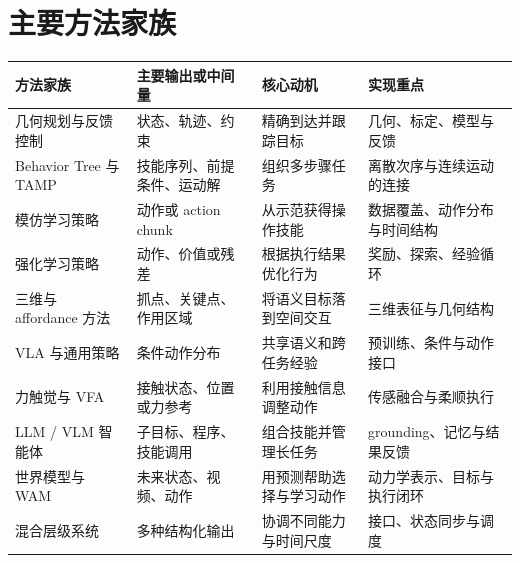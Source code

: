 \documentclass[UTF8,a4paper,11pt,oneside,openany,fontset=none]{ctexbook}
\begin{document}
\section{主要方法家族}

{\small %
\begin{longtable}[]{@{}
  >{\raggedright\arraybackslash}p{}
  >{\raggedright\arraybackslash}p{}
  >{\raggedright\arraybackslash}p{}
  >{\raggedright\arraybackslash}p{}@{}}
\toprule\noalign{}
\begin{minipage}[b]{\linewidth}\raggedright
方法家族
\end{minipage} & \begin{minipage}[b]{\linewidth}\raggedright
主要输出或中间量
\end{minipage} & \begin{minipage}[b]{\linewidth}\raggedright
核心动机
\end{minipage} & \begin{minipage}[b]{\linewidth}\raggedright
实现重点
\end{minipage} \\
\midrule\noalign{}
\endhead
\bottomrule\noalign{}
\endlastfoot
几何规划与反馈控制 & 状态、轨迹、约束 & 精确到达并跟踪目标 & 几何、标定、模型与反馈 \\
Behavior Tree 与 TAMP & 技能序列、前提条件、运动解 & 组织多步骤任务 & 离散次序与连续运动的连接 \\
模仿学习策略 & 动作或 action chunk & 从示范获得操作技能 & 数据覆盖、动作分布与时间结构 \\
强化学习策略 & 动作、价值或残差 & 根据执行结果优化行为 & 奖励、探索、经验循环 \\
三维与 affordance 方法 & 抓点、关键点、作用区域 & 将语义目标落到空间交互 & 三维表征与几何结构 \\
VLA 与通用策略 & 条件动作分布 & 共享语义和跨任务经验 & 预训练、条件与动作接口 \\
力触觉与 VFA & 接触状态、位置或力参考 & 利用接触信息调整动作 & 传感融合与柔顺执行 \\
LLM / VLM 智能体 & 子目标、程序、技能调用 & 组合技能并管理长任务 & grounding、记忆与结果反馈 \\
世界模型与 WAM & 未来状态、视频、动作 & 用预测帮助选择与学习动作 & 动力学表示、目标与执行闭环 \\
混合层级系统 & 多种结构化输出 & 协调不同能力与时间尺度 & 接口、状态同步与调度 \\
\end{longtable}
}
\end{document}
